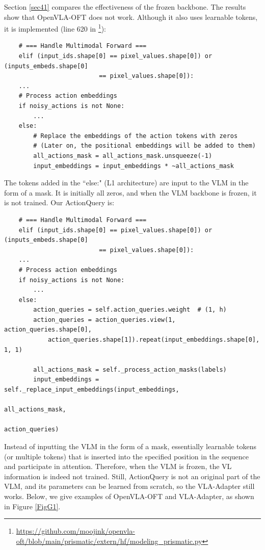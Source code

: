 \renewcommand{\thetable}{H\arabic{table}}
\renewcommand{\theHtable}{H\arabic{table}}
\setcounter{table}{0}

Section \ref{sec41} compares the effectiveness of the frozen backbone. The results show that OpenVLA-OFT does not work. Although it also uses learnable tokens, it is implemented (line 620 in \footnote{\url{https://github.com/moojink/openvla-oft/blob/main/prismatic/extern/hf/modeling_prismatic.py}}):

{\small
	\begin{verbatim}
	# === Handle Multimodal Forward ===
	elif (input_ids.shape[0] == pixel_values.shape[0]) or (inputs_embeds.shape[0] 
                          == pixel_values.shape[0]):
    ...
    # Process action embeddings
    if noisy_actions is not None:
        ...
    else:
        # Replace the embeddings of the action tokens with zeros
        # (Later on, the positional embeddings will be added to them)
        all_actions_mask = all_actions_mask.unsqueeze(-1) 
        input_embeddings = input_embeddings * ~all_actions_mask
	\end{verbatim}
}

The tokens added in the ``else:" (L1 architecture) are input to the VLM in the form of a mask. It is initially all zeros, and when the VLM backbone is frozen, it is not trained. Our ActionQuery is:

{\small
	\begin{verbatim}
	# === Handle Multimodal Forward ===
	elif (input_ids.shape[0] == pixel_values.shape[0]) or (inputs_embeds.shape[0] 
                          == pixel_values.shape[0]):
    ...
    # Process action embeddings
    if noisy_actions is not None:
        ...
    else:
        action_queries = self.action_queries.weight  # (1, h)
        action_queries = action_queries.view(1, action_queries.shape[0], 
            action_queries.shape[1]).repeat(input_embeddings.shape[0], 1, 1)
                  
        all_actions_mask = self._process_action_masks(labels)
        input_embeddings = self._replace_input_embeddings(input_embeddings, 
                                                          all_actions_mask, 
                                                          action_queries)
	\end{verbatim}
}

Instead of inputting the VLM in the form of a mask, essentially learnable tokens (or multiple tokens) that is inserted into the specified position in the sequence and participate in attention. Therefore, when the VLM is frozen, the VL information is indeed not trained. Still, ActionQuery is not an original part of the VLM, and its parameters can be learned from scratch, so the VLA-Adapter still works. Below, we give examples of OpenVLA-OFT and VLA-Adapter, as shown in Figure \ref{FigG1}.


